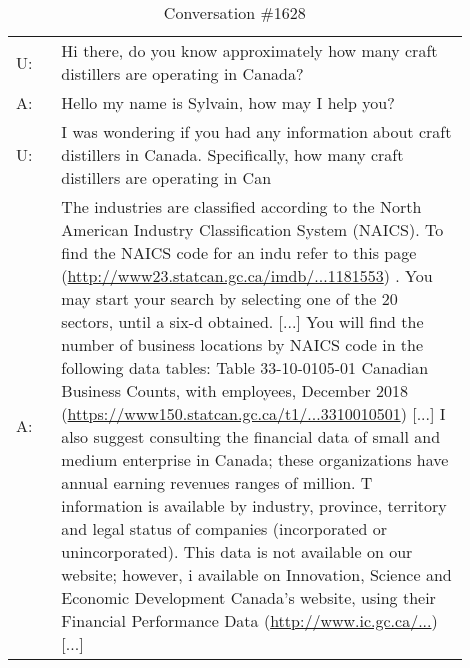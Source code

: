 \documentclass[11pt]{article}
\begin{document}
\begin{table*}[h]
    \small
    \centering
    \begin{tabular}{l p{0.9\linewidth}}
        \toprule
        U: & Hi there, do you know approximately how many craft distillers are operating in Canada?
        \\
        A: & Hello my name is Sylvain, how may I help you? 
        \\
        U: & I was wondering if you had any information about craft distillers in Canada. Specifically, how many craft distillers are operating in Can
        \\
        A: & The industries are classified according to the North American Industry Classification System (NAICS). To find the NAICS code for an indu refer to this page (\href{http://www23.statcan.gc.ca/imdb/p3VD.pl?Function=getVD&TVD=1181553}{http://www23.statcan.gc.ca/imdb/...1181553}) . You may start your search by selecting one of the 20 sectors, until a six-d obtained. [...] You will find the number of business locations by NAICS code in the following data tables: Table 33-10-0105-01 Canadian Business Counts, with employees, December 2018 (\href{https://www150.statcan.gc.ca/t1/tbl1/en/tv.action?pid=3310010501}{https://www150.statcan.gc.ca/t1/...3310010501}) [...] I also suggest consulting the financial data of small and medium enterprise in Canada; these organizations have annual earning revenues ranges of 
         million. T information is available by industry, province, territory and legal status of companies (incorporated or unincorporated). This data is not available on our website; however, i available on Innovation, Science and Economic Development Canada’s website, using their Financial Performance Data (\href{http://www.ic.gc.ca/eic/site/pp-pp.nsf/eng/home}{http://www.ic.gc.ca/...})[...]
        \\
        \bottomrule

    \end{tabular}
    \caption{Conversation \#1628}
    \label{tab:sample_conversation_1628}
\end{table*}
\end{document}
